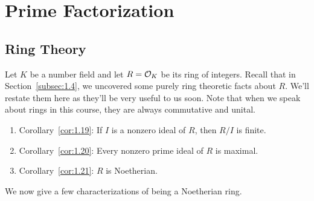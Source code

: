 \section{Prime Factorization}\label{sec:3}

\subsection{Ring Theory}\label{subsec:3.1}
Let $K$ be a number field and let $R = {\cal O}_K$ be its ring of integers. 
Recall that in Section~\ref{subsec:1.4}, we uncovered some purely 
ring theoretic facts about $R$. We'll restate them here as they'll be 
very useful to us soon. Note that when we speak about rings in this 
course, they are always commutative and unital.
\begin{enumerate}[(1)]
    \item Corollary~\ref{cor:1.19}: If $I$ is a nonzero ideal of $R$, then 
    $R/I$ is finite. 
    \item Corollary~\ref{cor:1.20}: Every nonzero prime ideal of $R$ is maximal.
    \item Corollary~\ref{cor:1.21}: $R$ is Noetherian. 
\end{enumerate}

We now give a few characterizations of being a Noetherian ring.

